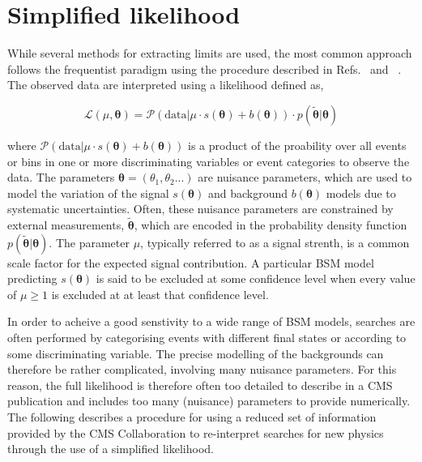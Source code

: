 \section{Simplified likelihood}
\label{sec:simplified-likelihood}

While several methods for extracting 
limits are used, the most common approach follows the frequentist paradigm using the procedure 
described in Refs.~\cite{Chatrchyan:2012tx} and ~\cite{CMS-NOTE-2011-005}. 
The observed data are interpreted using a likelihood defined as,

\begin{equation}
 \mathcal{L}(\mu, \boldsymbol{\theta}) = 
 \mathcal{P}(\mathrm{data}|\mu\cdot s(\boldsymbol{\theta}) + b(\boldsymbol{\theta})) \cdot p(\tilde{\boldsymbol{\theta}}|\boldsymbol{\theta})
\label{eq:generic-likelihood}
\end{equation}

where $\mathcal{P}(\mathrm{data}|\mu\cdot s(\boldsymbol{\theta}) + b(\boldsymbol{\theta}))$ is a product of the proability 
over all events or bins in one or more discriminating variables or event categories to observe the data. The parameters 
$\boldsymbol{\theta}=\left(\theta_{1},\theta_{2}...\right)$ are nuisance parameters, which are used to model the variation of the 
signal $s(\boldsymbol{\theta})$ and background $b(\boldsymbol{\theta})$ models due to systematic uncertainties. Often, these nuisance 
parameters are constrained by external measurements, $\tilde{\boldsymbol{\theta}}$, which are encoded in the 
probability density function $p(\tilde{\boldsymbol{\theta}}|\boldsymbol{\theta})$. 
The parameter $\mu$, typically referred to as a signal strenth, is a common scale factor for the expected signal contribution. 
A particular BSM model predicting $s(\boldsymbol{\theta})$ is said to be excluded at some confidence level 
when every value of $\mu\ge1$ is excluded at at least that confidence level.

In order to acheive a good senstivity to a wide range of BSM models, searches are often performed 
by categorising events with different final states or according to some discriminating variable. 
The precise modelling of the backgrounds can therefore be rather complicated, involving many 
nuisance parameters. For this reason, the full likelihood is therefore often 
too detailed to describe in a CMS publication and includes too many (nuisance) parameters to provide numerically. 
The following describes a procedure for using a reduced set of information provided by the CMS Collaboration to 
re-interpret searches for new physics through the use of a simplified likelihood. 


